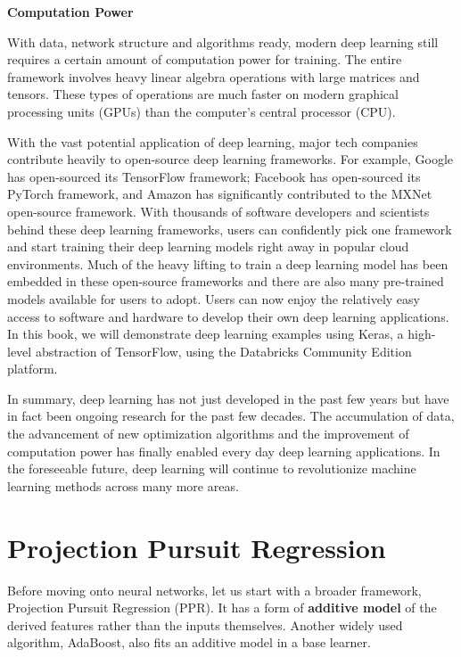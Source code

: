\documentclass[
  12pt,
]{krantz}
\begin{document}
\textbf{Computation Power}

With data, network structure and algorithms ready, modern deep learning still requires a certain amount of computation power for training. The entire framework involves heavy linear algebra operations with large matrices and tensors. These types of operations are much faster on modern graphical processing units (GPUs) than the computer's central processor (CPU).

With the vast potential application of deep learning, major tech companies contribute heavily to open-source deep learning frameworks. For example, Google has open-sourced its TensorFlow framework; Facebook has open-sourced its PyTorch framework, and Amazon has significantly contributed to the MXNet open-source framework. With thousands of software developers and scientists behind these deep learning frameworks, users can confidently pick one framework and start training their deep learning models right away in popular cloud environments. Much of the heavy lifting to train a deep learning model has been embedded in these open-source frameworks and there are also many pre-trained models available for users to adopt. Users can now enjoy the relatively easy access to software and hardware to develop their own deep learning applications. In this book, we will demonstrate deep learning examples using Keras, a high-level abstraction of TensorFlow, using the Databricks Community Edition platform.

In summary, deep learning has not just developed in the past few years but have in fact been ongoing research for the past few decades. The accumulation of data, the advancement of new optimization algorithms and the improvement of computation power has finally enabled every day deep learning applications. In the foreseeable future, deep learning will continue to revolutionize machine learning methods across many more areas.

\hypertarget{projection-pursuit-regression}{%
\section{Projection Pursuit Regression}\label{projection-pursuit-regression}}

Before moving onto neural networks, let us start with a broader framework, Projection Pursuit Regression (PPR). It has a form of \textbf{additive model} of the derived features rather than the inputs themselves. Another widely used algorithm, AdaBoost, also fits an additive model in a base learner.
\end{document}
